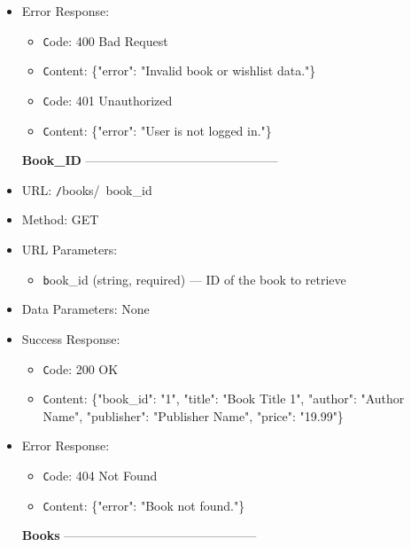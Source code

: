 \begin{itemize}
\item Error Response:
\begin{itemize} 
  \item \texttt Code: 400 Bad Request  
  \item \texttt Content:  \{"error": "Invalid book or wishlist data."\}
    
  \item \texttt Code: 401 Unauthorized  
  \item \texttt Content:  \{"error": "User is not logged in."\}
\end{itemize} 

\item[\textbf{Book\_ID}] -----------------------------------------------

\item URL: \texttt /books/\ book\_id\    
\item Method: GET  
\item URL Parameters:
\begin{itemize}  
  \item \texttt book\_id (string, required) — ID of the book to retrieve
\end{itemize} 
\item Data Parameters: None
\item Success Response:
\begin{itemize}
  \item \texttt Code: 200 OK  
  \item \texttt Content:  \{"book\_id": "1",
    "title": "Book Title 1",
    "author": "Author Name",
    "publisher": "Publisher Name",
    "price": "19.99"\}
\end{itemize} 
\item Error Response:
\begin{itemize}
  \item \texttt Code: 404 Not Found  
  \item \texttt Content:  \{"error": "Book not found."\} 
\end{itemize}


\item[\textbf{Books}] -----------------------------------------------


\end{itemize}
